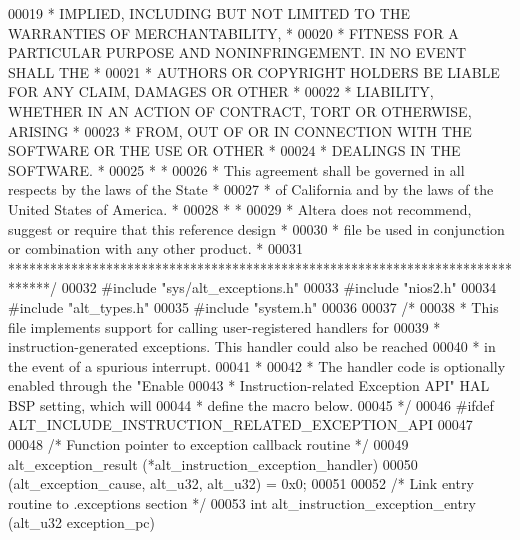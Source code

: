 \begin{DoxyCode}
00019 \textcolor{comment}{* IMPLIED, INCLUDING BUT NOT LIMITED TO THE WARRANTIES OF MERCHANTABILITY,    *}
00020 \textcolor{comment}{* FITNESS FOR A PARTICULAR PURPOSE AND NONINFRINGEMENT. IN NO EVENT SHALL THE *}
00021 \textcolor{comment}{* AUTHORS OR COPYRIGHT HOLDERS BE LIABLE FOR ANY CLAIM, DAMAGES OR OTHER      *}
00022 \textcolor{comment}{* LIABILITY, WHETHER IN AN ACTION OF CONTRACT, TORT OR OTHERWISE, ARISING     *}
00023 \textcolor{comment}{* FROM, OUT OF OR IN CONNECTION WITH THE SOFTWARE OR THE USE OR OTHER         *}
00024 \textcolor{comment}{* DEALINGS IN THE SOFTWARE.                                                   *}
00025 \textcolor{comment}{*                                                                             *}
00026 \textcolor{comment}{* This agreement shall be governed in all respects by the laws of the State   *}
00027 \textcolor{comment}{* of California and by the laws of the United States of America.              *}
00028 \textcolor{comment}{*                                                                             *}
00029 \textcolor{comment}{* Altera does not recommend, suggest or require that this reference design    *}
00030 \textcolor{comment}{* file be used in conjunction or combination with any other product.          *}
00031 \textcolor{comment}{******************************************************************************/}
00032 \textcolor{preprocessor}{#include "sys/alt_exceptions.h"}
00033 \textcolor{preprocessor}{#include "nios2.h"}
00034 \textcolor{preprocessor}{#include "alt_types.h"}
00035 \textcolor{preprocessor}{#include "system.h"}
00036 
00037 \textcolor{comment}{/*}
00038 \textcolor{comment}{ * This file implements support for calling user-registered handlers for}
00039 \textcolor{comment}{ * instruction-generated exceptions. This handler could also be reached}
00040 \textcolor{comment}{ * in the event of a spurious interrupt.}
00041 \textcolor{comment}{ *}
00042 \textcolor{comment}{ * The handler code is optionally enabled through the "Enable}
00043 \textcolor{comment}{ * Instruction-related Exception API" HAL BSP setting, which will}
00044 \textcolor{comment}{ * define the macro below.}
00045 \textcolor{comment}{ */}
00046 \textcolor{preprocessor}{#ifdef ALT\_INCLUDE\_INSTRUCTION\_RELATED\_EXCEPTION\_API}
00047 
00048 \textcolor{comment}{/* Function pointer to exception callback routine */}
00049 alt_exception_result (*alt_instruction_exception_handler)
00050   (alt_exception_cause, alt_u32, alt_u32) = 0x0;
00051 
00052 \textcolor{comment}{/* Link entry routine to .exceptions section */}
00053 \textcolor{keywordtype}{int} alt\_instruction\_exception\_entry (alt_u32 exception\_pc)

\end{DoxyCode}
